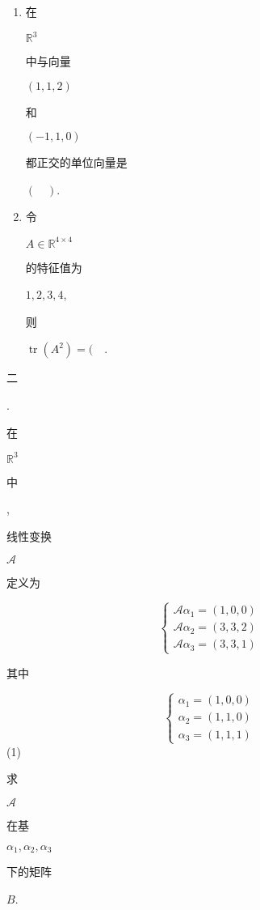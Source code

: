 \documentclass[10pt]{article}
\begin{document}
\begin{enumerate}
  \item \begin{CJK}{UTF8}{mj}在\end{CJK} $\mathbb{R}^{3}$ \begin{CJK}{UTF8}{mj}中与向量\end{CJK} $(1,1,2)$ \begin{CJK}{UTF8}{mj}和\end{CJK} $(-1,1,0)$ \begin{CJK}{UTF8}{mj}都正交的单位向量是\end{CJK} $(\quad)$.

  \item \begin{CJK}{UTF8}{mj}令\end{CJK} $A \in \mathbb{R}^{4 \times 4}$ \begin{CJK}{UTF8}{mj}的特征值为\end{CJK} $1,2,3,4$, \begin{CJK}{UTF8}{mj}则\end{CJK} $\operatorname{tr}\left(A^{2}\right)=(\quad$.

\end{enumerate}
\begin{CJK}{UTF8}{mj}二\end{CJK}. \begin{CJK}{UTF8}{mj}在\end{CJK} $\mathbb{R}^{3}$ \begin{CJK}{UTF8}{mj}中\end{CJK}, \begin{CJK}{UTF8}{mj}线性变换\end{CJK} $\mathscr{A}$ \begin{CJK}{UTF8}{mj}定义为\end{CJK}
$$
\left\{\begin{array}{l}
\mathscr{A} \alpha_{1}=(1,0,0) \\
\mathscr{A} \alpha_{2}=(3,3,2) \\
\mathscr{A} \alpha_{3}=(3,3,1)
\end{array}\right.
$$
\begin{CJK}{UTF8}{mj}其中\end{CJK}
$$
\left\{\begin{array}{l}
\alpha_{1}=(1,0,0) \\
\alpha_{2}=(1,1,0) \\
\alpha_{3}=(1,1,1)
\end{array}\right.
$$
(1) \begin{CJK}{UTF8}{mj}求\end{CJK} $\mathscr{A}$ \begin{CJK}{UTF8}{mj}在基\end{CJK} $\alpha_{1}, \alpha_{2}, \alpha_{3}$ \begin{CJK}{UTF8}{mj}下的矩阵\end{CJK} $B$.
\end{document}
